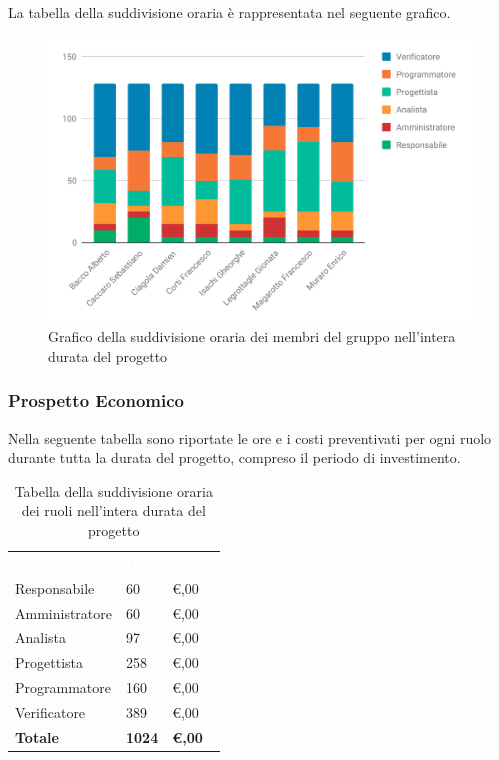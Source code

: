 La tabella della suddivisione oraria è rappresentata nel seguente grafico.
\begin{figure}[H]
	\includegraphics[width=1\linewidth]{Preventivo/grafici/TI1.pdf}
	\caption{Grafico della suddivisione oraria dei membri del gruppo nell'intera durata del progetto}
\end{figure}

\subsubsection{Prospetto Economico}
Nella seguente tabella sono riportate le ore e i costi preventivati per ogni ruolo durante tutta la durata del progetto, compreso il periodo di investimento.


\begin{table}[H]	
	\begin{center}
	    \begin{tabular}{C{4cm}C{1cm}C{3,5cm}}
			\textcolor{white}{\textbf{Ruolo}} & \textcolor{white}{\textbf{Ore}} & \textcolor{white}{\textbf{Costo}}
			\\
			Responsabile & 60 & \euro {},00 \\
			Amministratore & 60 & \euro {},00 \\
			Analista & 97 & \euro {},00 \\
			Progettista & 258 & \euro {},00 \\
			Programmatore & 160 & \euro {},00 \\
			Verificatore & 389 & \euro {},00 \\
			\textbf{Totale} & \textbf{1024} & \textbf{\euro {},00} \\

		\end{tabular}
	    \caption{Tabella della suddivisione oraria dei ruoli nell'intera durata del progetto} \label{tab:tabellaRuoliProgInt} 
	\end{center}
\end{table}


